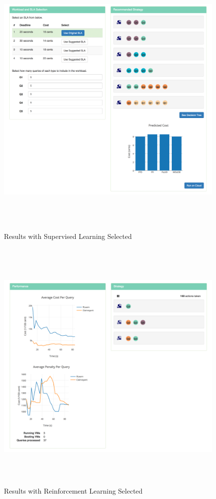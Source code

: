 \documentclass{brandiss}
\numberwithin{section}{chapter}
\numberwithin{figure}{chapter}
\theoremstyle{definition}
\theoremstyle{plain}
\theoremstyle{remark}
\begin{document}
\begin{figure}[htbp]
  \centering
  \includegraphics[height=5.5in]{demo-supervised}
  \caption{Results with Supervised Learning Selected}
  \label{fig:demo-supervised}
\end{figure}

\begin{figure}[htbp]
  \centering
  \includegraphics[height=5in]{demo-reinforcement}
  \caption{Results with Reinforcement Learning Selected}
  \label{fig:demo-reinforcement}
\end{figure}
\end{document}
